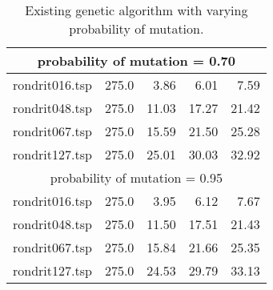 \begin{table}[H]
{\begin{tabular}{l rrrr}
\multicolumn{5}{c}{probability of mutation = 0.70}\\ 
\midrule
rondrit016.tsp & 275.0 & 3.86 & 6.01 & 7.59 \\
rondrit048.tsp & 275.0 & 11.03 & 17.27 & 21.42 \\
rondrit067.tsp & 275.0 & 15.59 & 21.50 & 25.28 \\
rondrit127.tsp & 275.0 & 25.01 & 30.03 & 32.92 \\
\midrule
\multicolumn{5}{c}{probability of mutation = 0.95}\\ 
\midrule
rondrit016.tsp & 275.0 & 3.95 & 6.12 & 7.67 \\
rondrit048.tsp & 275.0 & 11.50 & 17.51 & 21.43 \\
rondrit067.tsp & 275.0 & 15.84 & 21.66 & 25.35 \\
rondrit127.tsp & 275.0 & 24.53 & 29.79 & 33.13 \\
\bottomrule 
\end{tabular} 
}
\caption{Existing genetic algorithm with varying probability of mutation.}
\label{tab:vary_mutation}
\end{table}
